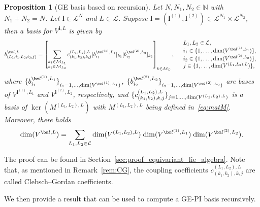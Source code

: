 \documentclass{article}
\newcommand{\dimge}[2]{\dim(V^{#1,#2})}
\newtheorem{proposition}[theorem]{Proposition}
\numberwithin{equation}{section}
\def\N{\mathbb{N}}
\def\bl{{\bm l}}
\def\calM{\mathcal{M}}
\def\calL{\mathcal{L}}
\def\Nat{{N}}
\def\dim{{{\rm dim}}}
\begin{document}
{\begin{proposition}[GE basis based on recursion]
\label{prop:GE_rec}
Let $N,N_1,N_2\in \N$ with $N_1+N_2=N$.
Let $\bl\in\calL^\Nat$  and $L\in\calL$. Suppose $\bl = (\bl^{(1)}, \bl^{(2)})\in\calL^{\Nat_1}\times\calL^{\Nat_2}$, then a basis for $V^{\bl,L}$ is given by
\[
    b^{\bl,L}_{(L_1,i_1,L_2,i_2,j)} = \left[ \sum_{\substack{k_1\in\calM_{L_1} \\  k_2\in\calM_{L_2}}} 
    c_{(k_1,k_2), k,j}^{(L_1,L_2),L}
    [b^{\bl^{(1)},L_1}_{i_1}]_{k_1} [b^{\bl^{(2)},L_2}_{i_2}]_{k_2} \right]_{k\in \calM_L},\quad 
    \begin{array}{l}
         L_1,L_2\in\calL,   \\
         i_1\in\{1,\ldots, \dimge{\bl^{(1)}}{L_1}\}, \\
         i_2\in\{1,\ldots, \dimge{\bl^{(2)}}{L_2}\},\\
         j \in \{1,\ldots,\dimge{(L_1,L_2)}{L}\},
    \end{array}
\]
where $\{b^{\bl^{(1)},L_1}_{i_1}\}_{i_1 = 1,\ldots, \dimge{\bl^{(1)}}{L_1}}$, 
$\{b^{\bl^{(2)},L_2}_{i_2}\}_{i_2 = 1,\ldots, \dimge{\bl^{(2)}}{L_2}}$ are bases of $V^{\bl^{(1)},L_1}$ and $V^{\bl^{(2)},L_2}$, respectively, and
$\{c_{(k_1,k_2), k,j}^{(L_1,L_2),L}\}_{j=1,\ldots,\dimge{(L_1,L_2)}{L}}$ is a basis of $\ker(M^{(L_1,L_2),L})$ with $M^{(L_1,L_2),L}$ being defined in~\eqref{eq:matM}. 
Moreover, there holds
\begin{equation}\label{eq:dim_GE_rec}
    \dimge{\bl}{L} = \sum_{L_1,L_2\in \calL} \dimge{(L_1,L_2)}{L} \;\dimge{\bl^{(1)}}{L_1}\;\dimge{\bl^{(2)}}{L_2}.
\end{equation}
\end{proposition}

The proof can be found in Section~\ref{sec:proof_equivariant_lie_algebra}.
Note that,
as mentioned in Remark~\ref{rem:CG}, 
the coupling coefficients $c_{(k_1,k_2), k,j}^{(L_1,L_2),L}$ are called Clebsch--Gordan coefficients. 

We then provide a result that can be used to compute a GE-PI basis recursively. 

}
\end{document}
